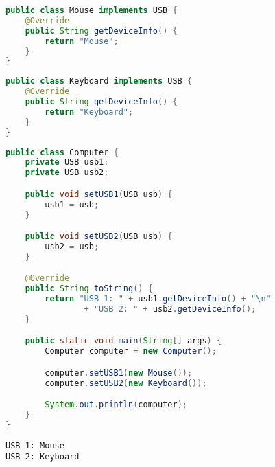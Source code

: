 \begin{lstlisting}[language=Java]
public class Mouse implements USB {
    @Override
    public String getDeviceInfo() {
        return "Mouse";
    }
}
\end{lstlisting}

\begin{lstlisting}[language=Java]
public class Keyboard implements USB {
    @Override
    public String getDeviceInfo() {
        return "Keyboard";
    }
}
\end{lstlisting}

\begin{lstlisting}[language=Java]
public class Computer {
    private USB usb1;
    private USB usb2;

    public void setUSB1(USB usb) {
        usb1 = usb;
    }

    public void setUSB2(USB usb) {
        usb2 = usb;
    }

    @Override
    public String toString() {
        return "USB 1: " + usb1.getDeviceInfo() + "\n"
                + "USB 2: " + usb2.getDeviceInfo();
    }

    public static void main(String[] args) {
        Computer computer = new Computer();

        computer.setUSB1(new Mouse());
        computer.setUSB2(new Keyboard());

        System.out.println(computer);
    }
}
\end{lstlisting}

\begin{tcolorbox}
    \begin{verbatim}
USB 1: Mouse
USB 2: Keyboard
	\end{verbatim}
\end{tcolorbox}

\newpage